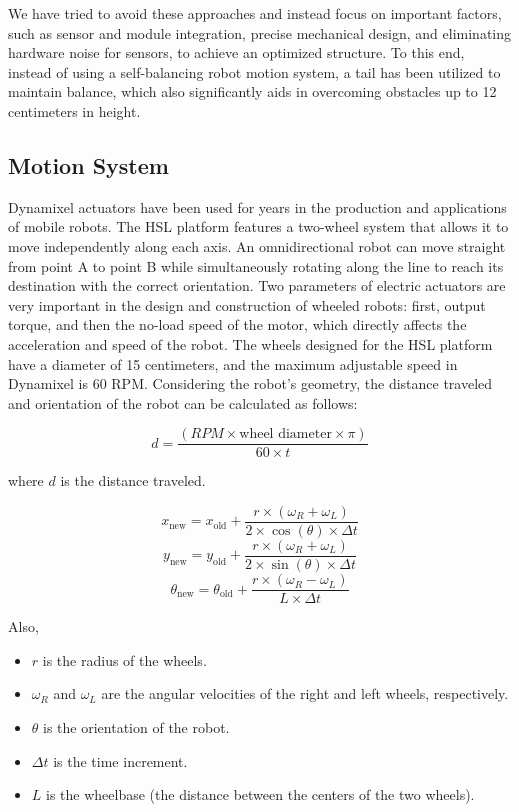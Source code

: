 \documentclass[conference]{IEEEtran}
\begin{document}
We have tried to avoid these approaches and instead focus on important factors, such as sensor and module integration, precise mechanical design, and eliminating hardware noise for sensors, to achieve an optimized structure. To this end, instead of using a self-balancing robot motion system, a tail has been utilized to maintain balance, which also significantly aids in overcoming obstacles up to 12 centimeters in height.

\subsection{Motion System}
Dynamixel actuators have been used for years in the production and applications of mobile robots. The HSL platform features a two-wheel system that allows it to move independently along each axis. An omnidirectional robot can move straight from point A to point B while simultaneously rotating along the line to reach its destination with the correct orientation. Two parameters of electric actuators are very important in the design and construction of wheeled robots: first, output torque, and then the no-load speed of the motor, which directly affects the acceleration and speed of the robot. The wheels designed for the HSL platform have a diameter of 15 centimeters, and the maximum adjustable speed in Dynamixel is 60 RPM. Considering the robot's geometry, the distance traveled and orientation of the robot can be calculated as follows:

\begin{equation}
d = \frac{(RPM \times \text{wheel diameter} \times \pi)}{60 \times t} \label{eq:distance}
\end{equation}

where \( d \) is the distance traveled.

\begin{equation}
x_{\text{new}} = x_{\text{old}} + \frac{r \times (\omega_R + \omega_L)}{2 \times \cos(\theta) \times \Delta t}
\end{equation}
\begin{equation}
y_{\text{new}} = y_{\text{old}} + \frac{r \times (\omega_R + \omega_L)}{2 \times \sin(\theta) \times \Delta t}
\end{equation}
\begin{equation}
\theta_{\text{new}} = \theta_{\text{old}} + \frac{r \times (\omega_R - \omega_L)}{L \times \Delta t}
\end{equation}

Also,
\begin{itemize}
    \item \( r \) is the radius of the wheels.
    \item \( \omega_R \) and \( \omega_L \) are the angular velocities of the right and left wheels, respectively.
    \item \( \theta \) is the orientation of the robot.
    \item \( \Delta t \) is the time increment.
    \item \( L \) is the wheelbase (the distance between the centers of the two wheels).
\end{itemize}
\end{document}
